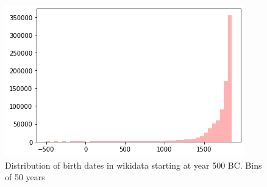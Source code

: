 \documentclass[10pt, a4paper]{article}
\begin{document}
\begin{figure}[t]
\centering
\includegraphics[width=\columnwidth]{img/naissances_wd.png} 
\caption{Distribution of birth dates in wikidata starting at year 500 BC. Bins of 50 years}
\label{fig:naissances_wd}
\end{figure}
\end{document}
